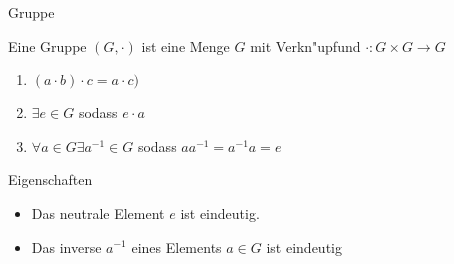 \documentclass[class=article, crop=false]{standalone}
\begin{document}
\begin{zettel}{Gruppe}
\begin{flashcard}

    \begin{definition}[Gruppe]
        Eine Gruppe $(G, \cdot )$ ist eine Menge $G$ mit Verkn"upfund $\cdot : G \times G \longrightarrow G$ 
        \begin{enumerate}
            \item $(a \cdot b) \cdot c =  a \cdot c) $ 
            \item $\exists e \in  G$  sodass $e \cdot  a $ 
            \item $\forall a \in  G \exists a^{-1} \in  G$  sodass $aa^{-1} =  a^{-1} a = e$ 
        \end{enumerate}
    
\end{definition}
\end{flashcard}
\begin{remark}
Eigenschaften
\begin{itemize}
    \item Das neutrale Element $e$ ist eindeutig.
    \item Das inverse $a^{-1} $ eines Elements $a \in  G$ ist eindeutig
\end{itemize}
\end{remark}
\end{zettel}
\end{document}
